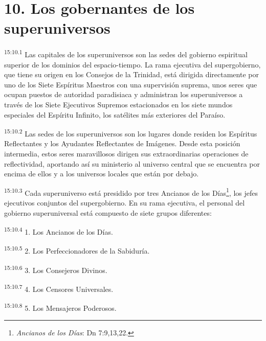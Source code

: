 \section*{10. Los gobernantes de los superuniversos}
\par
\textsuperscript{15:10.1} Las capitales de los superuniversos son las sedes del gobierno espiritual superior de los dominios del espacio-tiempo. La rama ejecutiva del supergobierno, que tiene su origen en los Consejos de la Trinidad, está dirigida directamente por uno de los Siete Espíritus Maestros con una supervisión suprema, unos seres que ocupan puestos de autoridad paradisiaca y administran los superuniversos a través de los Siete Ejecutivos Supremos estacionados en los siete mundos especiales del Espíritu Infinito, los satélites más exteriores del Paraíso.

\par
\textsuperscript{15:10.2} Las sedes de los superuniversos son los lugares donde residen los Espíritus Reflectantes y los Ayudantes Reflectantes de Imágenes. Desde esta posición intermedia, estos seres maravillosos dirigen sus extraordinarias operaciones de reflectividad, aportando así su ministerio al universo central que se encuentra por encima de ellos y a los universos locales que están por debajo.

\par
\textsuperscript{15:10.3} Cada superuniverso está presidido por tres Ancianos de los Días\footnote{\textit{Ancianos de los Días}: Dn 7:9,13,22.}, los jefes ejecutivos conjuntos del supergobierno. En su rama ejecutiva, el personal del gobierno superuniversal está compuesto de siete grupos diferentes:

\par
\textsuperscript{15:10.4} 1. Los Ancianos de los Días.

\par
\textsuperscript{15:10.5} 2. Los Perfeccionadores de la Sabiduría.

\par
\textsuperscript{15:10.6} 3. Los Consejeros Divinos.

\par
\textsuperscript{15:10.7} 4. Los Censores Universales.

\par
\textsuperscript{15:10.8} 5. Los Mensajeros Poderosos.

